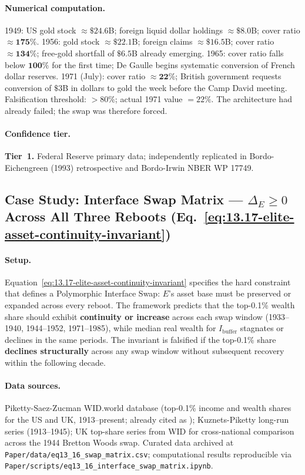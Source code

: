\paragraph{Numerical computation.}
1949: US gold stock $\approx \$24.6$B; foreign liquid dollar holdings $\approx \$8.0$B; cover ratio $\approx \mathbf{175\%}$. 1956: gold stock $\approx \$22.1$B; foreign claims $\approx \$16.5$B; cover ratio $\approx \mathbf{134\%}$; free-gold shortfall of $\$6.5$B already emerging. 1965: cover ratio falls below $\mathbf{100\%}$ for the first time; De Gaulle begins systematic conversion of French dollar reserves. 1971 (July): cover ratio $\approx \mathbf{22\%}$; British government requests conversion of $\$3$B in dollars to gold the week before the Camp David meeting. Falsification threshold: $> 80\%$; actual 1971 value $= 22\%$. The architecture had already failed; the swap was therefore forced.

\paragraph{Confidence tier.} \textbf{Tier~1.} Federal Reserve primary data; independently replicated in Bordo-Eichengreen (1993) retrospective and Bordo-Irwin NBER WP 17749.

\subsection*{Case Study: Interface Swap Matrix --- $\Delta_E \geq 0$ Across All Three Reboots (Eq.~\eqref{eq:13.17-elite-asset-continuity-invariant})}
\label{cs:delta_e_invariant}

\paragraph{Setup.}
Equation~\eqref{eq:13.17-elite-asset-continuity-invariant} specifies the hard constraint that defines a Polymorphic Interface Swap: $E$'s asset base must be preserved or expanded across every reboot. The framework predicts that the top-0.1\% wealth share should exhibit \textbf{continuity or increase} across each swap window (1933--1940, 1944--1952, 1971--1985), while median real wealth for $I_{\text{buffer}}$ stagnates or declines in the same periods. The invariant is falsified if the top-0.1\% share \textbf{declines structurally} across any swap window without subsequent recovery within the following decade.

\paragraph{Data sources.}
Piketty-Saez-Zucman WID.world database (top-0.1\% income and wealth shares for the US and UK, 1913--present; already cited as \cite{piketty_saez_zucman_2018}); Kuznets-Piketty long-run series (1913--1945); UK top-share series from WID for cross-national comparison across the 1944 Bretton Woods swap. Curated data archived at \texttt{Paper/data/eq13\_16\_swap\_matrix.csv}; computational results reproducible via \texttt{Paper/scripts/eq13\_16\_interface\_swap\_matrix.ipynb}.

